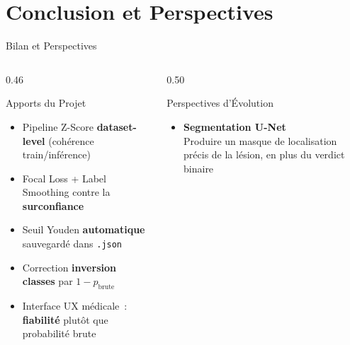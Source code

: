 \documentclass[aspectratio=169, 12pt, compress]{beamer}
\newcommand{\cmark}{\textcolor{EMSIgreen}{\ding{51}}}
\newcommand{\code}[1]{\texttt{\small #1}}
\begin{document}
\section{Conclusion et Perspectives}

\begin{frame}{Bilan et Perspectives}

  \begin{columns}[T]

    \begin{column}{0.46\textwidth}
      \begin{exampleblock}{Apports du Projet}
        \begin{itemize}\small
          \item[\cmark] Pipeline Z-Score \textbf{dataset-level}
                        (cohérence train/inférence)
          \item[\cmark] Focal Loss + Label Smoothing
                        contre la \textbf{surconfiance}
          \item[\cmark] Seuil Youden \textbf{automatique}
                        sauvegardé dans \code{.json}
          \item[\cmark] Correction \textbf{inversion classes}
                        par $1 - p_{\text{brute}}$
          \item[\cmark] Interface UX médicale~:
                        \textbf{fiabilité} plutôt que\\
                        probabilité brute
        \end{itemize}
      \end{exampleblock}
    \end{column}

    \begin{column}{0.50\textwidth}
      \begin{block}{Perspectives d'Évolution}
        \begin{itemize}\small

          \item \textbf{Segmentation U-Net}\\
                {\scriptsize Produire un masque de localisation
                précis de la lésion, en plus du verdict binaire}


\end{itemize}
\end{block}
\end{column}
\end{columns}
\end{frame}
\end{document}
